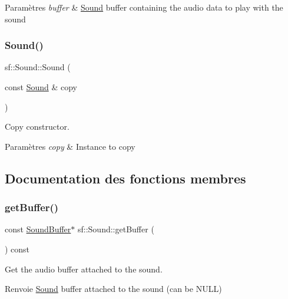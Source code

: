 \begin{DoxyParams}{Paramètres}
{\em buffer} & \hyperlink{classsf_1_1Sound}{Sound} buffer containing the audio data to play with the sound \\
\hline
\end{DoxyParams}
\mbox{\label{classsf_1_1Sound_ae05eeed6377932694d86b3011be366c0}} 
\subsubsection{\texorpdfstring{Sound()}{Sound()}\hspace{0.1cm}{\footnotesize\ttfamily [2/2]}}
{\footnotesize\ttfamily sf\+::\+Sound\+::\+Sound (\begin{DoxyParamCaption}\item[{const \hyperlink{classsf_1_1Sound}{Sound} \&}]{copy }\end{DoxyParamCaption})}



Copy constructor. 


\begin{DoxyParams}{Paramètres}
{\em copy} & Instance to copy \\
\hline
\end{DoxyParams}


\subsection{Documentation des fonctions membres}
\mbox{\label{classsf_1_1Sound_ab873727ae652c96b5a9437d7f8d8a44d}} 
\subsubsection{\texorpdfstring{get\+Buffer()}{getBuffer()}}
{\footnotesize\ttfamily const \hyperlink{classsf_1_1SoundBuffer}{Sound\+Buffer}$\ast$ sf\+::\+Sound\+::get\+Buffer (\begin{DoxyParamCaption}{ }\end{DoxyParamCaption}) const}



Get the audio buffer attached to the sound. 

\begin{DoxyReturn}{Renvoie}
\hyperlink{classsf_1_1Sound}{Sound} buffer attached to the sound (can be N\+U\+LL) 
\end{DoxyReturn}
\mbox{\label{classsf_1_1Sound_a054da07266ce8f39229495146e3041eb}} 
